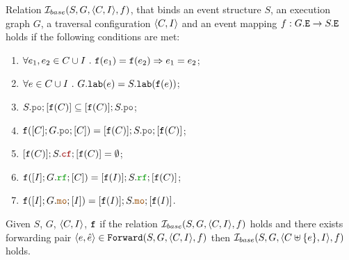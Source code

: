 \documentclass[12pt]{article}
\begin{document}
\begin{definition}
  Relation $\mathcal{I}_{base}(S, G, \langle C, I \rangle, f)$, that binds an 
  event structure $S$, an \imm execution graph $G$,
  a traversal configuration $\langle C, I \rangle$
  and an event mapping $f : G.{\mathtt{E}} \rightarrow S.{\mathtt{E}}$ 
  holds if the following conditions are met:
  \begin{enumerate}[label=\textbf{S.\arabic*}]

    \item \label{item:sim-inj}
      $\forall{e_1, e_2 \in C \cup I} ~.~ {\mathtt{f}}(e_1) = {\mathtt{f}}(e_2) \Rightarrow e_1 = e_2$;

    \item \label{item:sim-lab}
      $\forall{e \in C \cup I} ~.~ G.{\mathtt{lab}}(e) = S.{\mathtt{lab}}({\mathtt{f}}(e))$;

    \item \label{item:sim-po-prfx} 
      $S.\lPO;[\f(C)] \subseteq [\f(C)];S.\lPO$;

    \item \label{item:sim-po}
      $\f([C];G.\lPO;[C]) = [\f(C)];S.\lPO;[\f(C)]$;
    
    \item \label{item:sim-cf}
      $[\f(C)];S.\lCF;[\f(C)] = \emptyset$;

    \item \label{item:sim-rf}
      $\f([I];G.\lRF;[C]) = [\f(I)];S.\lRF;[\f(C)]$;

    \item \label{item:sim-mo}
      $\f([I];G.\lMO;[I]) = [\f(I)];S.\lMO;[\f(I)]$.
    
  \end{enumerate}
\end{definition}

\begin{lemma}
  \label{lemma:simb-forward}
  Given $S$, $G$, $\langle C, I \rangle$, ${\mathtt{f}}$
  if the relation $\mathcal{I}_{base}(S, G, \langle C, I \rangle, f)$ holds and 
  there exists forwarding pair $\langle e, \hat{e} \rangle \in {\mathtt{Forward}}(S, G, \langle C, I \rangle, f)$
  then $\mathcal{I}_{base}(S, G, \langle C \uplus \{e\}, I \rangle, f)$ holds. 
\end{lemma}



\end{document}

